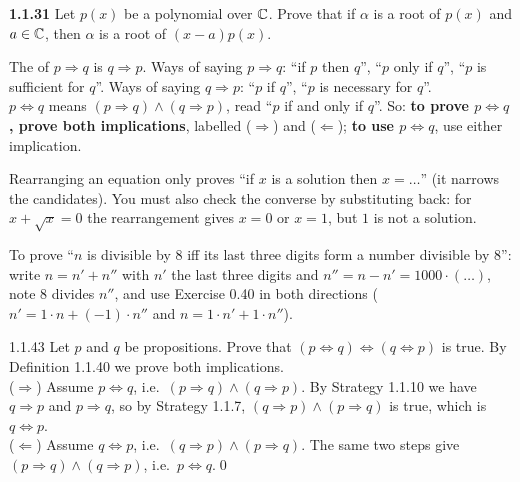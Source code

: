 \begin{trybox}[{1.1.31 \fO}]
\textbf{1.1.31} Let $p(x)$ be a polynomial over $\mathbb{C}$. Prove that if $\alpha$ is a root of $p(x)$ and $a\in\mathbb{C}$, then $\alpha$ is a root of $(x-a)p(x)$.
\end{trybox}

\begin{key}
The  of $p\Rightarrow q$ is $q\Rightarrow p$. Ways of saying $p\Rightarrow q$: ``if $p$ then $q$'', ``$p$ only if $q$'', ``$p$ is sufficient for $q$''. Ways of saying $q\Rightarrow p$: ``$p$ if $q$'', ``$p$ is necessary for $q$''. \\
$p\Leftrightarrow q$ means $(p\Rightarrow q)\wedge(q\Rightarrow p)$, read ``$p$ if and only if $q$''. So: \textbf{to prove $p\Leftrightarrow q$, prove both implications}, labelled ($\Rightarrow$) and ($\Leftarrow$); \textbf{to use $p\Leftrightarrow q$}, use either implication.
\end{key}
\begin{warn}
Rearranging an equation only proves ``if $x$ is a solution then $x=\dots$'' (it narrows the candidates). You must also check the converse by substituting back: for $x+\sqrt x=0$ the rearrangement gives $x=0$ or $x=1$, but $1$ is not a solution.
\end{warn}
\begin{key}
To prove ``$n$ is divisible by $8$ iff its last three digits form a number divisible by $8$'': write $n=n'+n''$ with $n'$ the last three digits and $n''=n-n'=1000\cdot(\dots)$, note $8$ divides $n''$, and use Exercise 0.40 in both directions ($n'=1\cdot n+(-1)\cdot n''$ and $n=1\cdot n'+1\cdot n''$).
\end{key}

\begin{bookex}[recommended]{1.1.43}
Let $p$ and $q$ be propositions. Prove that $(p\Leftrightarrow q)\Leftrightarrow(q\Leftrightarrow p)$ is true.
\solution
By Definition 1.1.40 we prove both implications.\\
($\Rightarrow$) Assume $p\Leftrightarrow q$, i.e.\ $(p\Rightarrow q)\wedge(q\Rightarrow p)$. By Strategy 1.1.10 we have $q\Rightarrow p$ and $p\Rightarrow q$, so by Strategy 1.1.7, $(q\Rightarrow p)\wedge(p\Rightarrow q)$ is true, which is $q\Leftrightarrow p$.\\
($\Leftarrow$) Assume $q\Leftrightarrow p$, i.e.\ $(q\Rightarrow p)\wedge(p\Rightarrow q)$. The same two steps give $(p\Rightarrow q)\wedge(q\Rightarrow p)$, i.e.\ $p\Leftrightarrow q$.\qed
\end{bookex}

